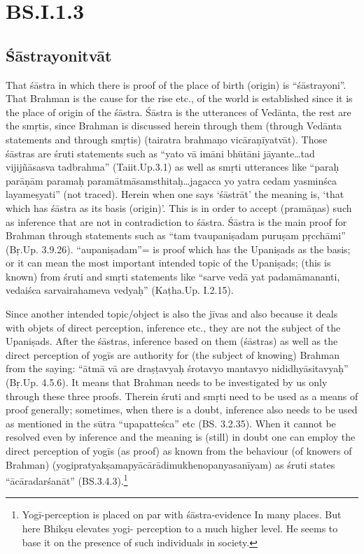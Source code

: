 \section*{BS.I.1.3}

\subsection*{Śāstrayonitvāt}

That śāstra in which there is proof of the place of birth (origin) is “śāstrayoni”. That Brahman is the cause for the rise etc., of the world is established since it is the place of origin of the śāstra. Śāstra is the utterances of Vedānta, the rest are the smṛtis, since Brahman is discussed herein through them (through Vedānta statements and through smṛtis) (tairatra brahmaṇo vicāraṇīyatvāt). Those śāstras are śruti statements such as “yato vā imāni bhūtāni jāyante…tad vijijñāsasva tadbrahma” (Taiit.Up.3.1) as well as smṛti utterances like “paraḥ parāṇām paramaḥ paramātmāsamsthitaḥ…jagacca yo yatra cedam yasminśca layameṣyati” (not traced). Herein when one says ‘śāstrāt’ the meaning is, ‘that which has śāstra as its basis (origin)’. This is in order to accept (pramāṇas) such as inference that are not in contradiction to śāstra. Śāstra is the main proof for Brahman through statements such as “tam tvaupaniṣadam puruṣam pṛcchāmi” (Bṛ.Up. 3.9.26). “aupaniṣadam”= is proof which has the Upaniṣads as the basis; or it can mean the most important intended topic of the Upaniṣads; (this is known) from śruti and smṛti statements like “sarve vedā yat padamāmananti, vedaiśca sarvairahameva vedyaḥ” (Kaṭha.Up. I.2.15).

Since another intended topic/object is also the jīvas and also because it deals with objets of direct perception, inference etc., they are not the subject  of the Upaniṣads. After the śāstras, inference based on them (śāstras) as well as the direct perception of yogīs are authority for (the subject of knowing) Brahman from the saying: “ātmā vā are draṣṭavyaḥ śrotavyo mantavyo nididhyāsitavyaḥ” (Bṛ.Up. 4.5.6). It means that Brahman needs to be investigated by us only through these three proofs. Therein śruti and smṛti need to be used as a means of proof generally; sometimes, when there is a doubt, inference also needs to be used as mentioned in the sūtra “upapatteśca” etc (BS. 3.2.35). When it cannot be resolved even by inference and the meaning is (still) in doubt one can employ the direct perception of yogīs (as proof) as known from the behaviour (of knowers of Brahman) (yogipratyakṣamapyācārādimukhenopanyasanīyam) as śruti states “ācāradarśanāt” (BS.3.4.3).\footnote{Yogī-perception is placed on par with śāstra-evidence In many places. But here Bhikṣu elevates yogi-
perception to a much higher level. He seems to base it on the presence of such individuals in society.} 

